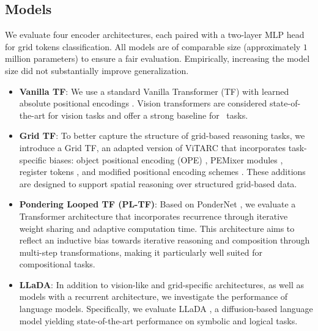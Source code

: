 \subsection{Models}
\label{subsec:models}

We evaluate four encoder architectures, each paired with a two-layer MLP head for grid tokens classification. All models are of comparable size (approximately $1$ million parameters) to ensure a fair evaluation. Empirically, increasing the model size did not substantially improve generalization.

\begin{itemize}

    \item \textbf{Vanilla TF}: We use a standard Vanilla Transformer (TF)\citep{dosovitskiy2021an} with learned absolute positional encodings \citep{vaswani2017attention}. Vision transformers are considered state-of-the-art for vision tasks and offer a strong baseline for \generatorName\ tasks.

    \item \textbf{Grid TF}: To better capture the structure of grid-based reasoning tasks, we introduce a Grid TF, an adapted version of ViTARC \citep{arc_vit} that incorporates task-specific biases: object positional encoding (OPE) \citep{arc_vit}, PEMixer modules \citep{arc_vit}, register tokens \cite{darcet2024vision}, and modified positional encoding schemes \citep{Shaw_Uszkoreit_Vaswani_2018, Su_RoFormer_2024}. These additions are designed to support spatial reasoning over structured grid-based data.

    \item \textbf{Pondering Looped TF (PL-TF)}: Based on PonderNet \cite{banino2021pondernet, dehghani2019universaltransformers}, we evaluate a Transformer architecture that incorporates recurrence through iterative weight sharing and adaptive computation time. This architecture aims to reflect an inductive bias towards iterative reasoning and composition through multi-step transformations, making it particularly well suited for compositional tasks.
    
    \item \textbf{LLaDA}: In addition to vision-like and grid-specific architectures, as well as models with a recurrent architecture, we investigate the performance of language models. Specifically, we evaluate LLaDA \citep{Nie_LLaDA_2025}, a diffusion-based language model yielding state-of-the-art performance on symbolic and logical tasks.
\end{itemize}

